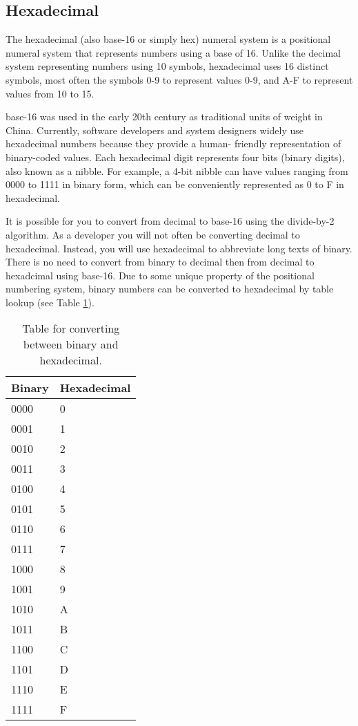 \subsection{Hexadecimal\label{sec:numbers:bases:hex}}


The hexadecimal (also \gls{base-16} or simply hex) numeral system is a positional numeral system that 
represents numbers using a base of 16. Unlike the decimal system representing numbers using 10 symbols, 
hexadecimal uses 16 distinct symbols, most often the symbols 0-9 to represent values 0-9, and A-F to 
represent values from 10 to 15. 

\Gls{base-16} was used in the early 20th century as traditional units of weight in China. %
Currently, software developers and system designers widely use hexadecimal numbers because they provide a human-
friendly representation of binary-coded values. Each hexadecimal digit represents four bits (binary digits), 
also known as a \gls{nibble}. For example, a 4-bit nibble can have values ranging from 0000 to 1111 in 
binary form, which can be conveniently represented as 0 to F in hexadecimal. 


It is possible for you to convert from decimal to \gls{base-16} using the \gls{divide-by-2} algorithm. 
As a developer you will not often be converting decimal to hexadecimal. Instead, you will use 
hexadecimal to abbreviate long texts of binary. There is no need to convert from binary to decimal 
then from decimal to hexadcimal using \gls{base-16}. Due to some unique property of the positional
numbering system, binary numbers can be converted to hexadecimal by table lookup (see Table \ref{tab:hex}). 

\begin{table}[t]\centering
    \caption{Table for converting between binary and hexadecimal.\label{tab:hex}}
    \begin{tabular}{|l|l|}\hline 
        Binary & Hexadecimal \\\hline\hline  
        0000 & 0 \\\hline 
        0001 & 1\\\hline 
        0010 & 2\\\hline 
        0011 & 3\\\hline 
        0100 & 4\\\hline 
        0101 & 5\\\hline 
        0110 & 6\\\hline 
        0111 & 7\\\hline 
        1000 & 8\\\hline 
        1001 & 9\\\hline 
        1010 & A\\\hline 
        1011 & B \\\hline 
        1100 & C\\\hline 
        1101 & D\\\hline 
        1110 & E \\\hline 
        1111 & F\\\hline 
    \end{tabular}
\end{table}

